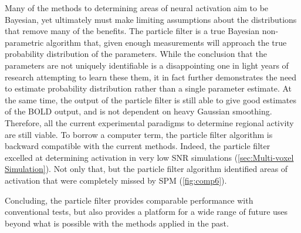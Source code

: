 Many of the methods to determining areas of neural activation aim
to be Bayesian, yet ultimately must make limiting assumptions about
the distributions that remove many of the benefits. 
The particle filter is a true Bayesian non-parametric algorithm that, given
enough measurements will approach the true probability distribution
of the parameters. While the conclusion that the parameters are not
uniquely identifiable is a disappointing one in light years of research 
attempting to learn these them, it in fact further demonstrates
the need to estimate probability distribution rather than a single 
parameter estimate. At the same time, the output of the particle filter
is still able to give good estimates of the BOLD output, and is not
dependent on heavy Gaussian smoothing. Therefore, all the current 
experimental paradigms to determine regional activity are still viable.
To borrow a computer term, the particle filter algorithm is backward 
compatible with the current methods. Indeed, the particle filter excelled
at determining activation in very low SNR simulations 
(\autoref{sec:Multi-voxel Simulation}). Not only that, but the particle
filter algorithm identified areas of activation that were completely
missed by SPM (\autoref{fig:comp6}). 

Concluding, the particle filter provides comparable performance with
conventional tests, but also provides a platform for a wide range of
future uses beyond what is possible with the methods applied in the
past.
